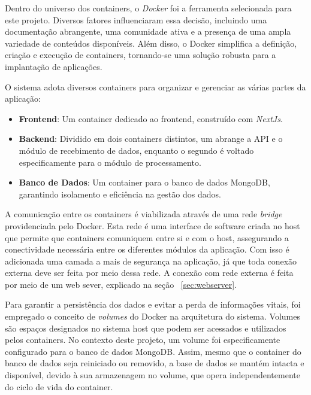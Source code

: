 Dentro do universo dos containers, o \textit{Docker} foi a ferramenta selecionada para este projeto. Diversos fatores influenciaram essa decisão, incluindo uma documentação abrangente, uma comunidade ativa e a presença de uma ampla variedade de conteúdos disponíveis. Além disso, o Docker simplifica a definição, criação e execução de containers, tornando-se uma solução robusta para a implantação de aplicações.

O sistema adota diversos containers para organizar e gerenciar as várias partes da aplicação:
\begin{itemize}
    \item \textbf{Frontend}: Um container dedicado ao frontend, construído com \textit{NextJs}.
    \item \textbf{Backend}: Dividido em dois containers distintos, um abrange a API e o módulo de recebimento de dados, enquanto o segundo é voltado especificamente para o módulo de processamento.
    \item \textbf{Banco de Dados}: Um container para o banco de dados MongoDB, garantindo isolamento e eficiência na gestão dos dados.
\end{itemize}

A comunicação entre os containers é viabilizada através de uma rede \textit{bridge} providenciada pelo Docker. Esta rede é uma interface de software criada no host que permite que containers comuniquem entre si e com o host, assegurando a conectividade necessária entre os diferentes módulos da aplicação. Com isso é adicionada uma camada a mais de segurança na aplicação, já que toda conexão externa deve ser feita por meio dessa rede. A conexão com rede externa é feita por meio de um web sever, explicado na seção ~\ref{sec:webserver}.

Para garantir a persistência dos dados e evitar a perda de informações vitais, foi empregado o conceito de \textit{volumes} do Docker na arquitetura do sistema. Volumes são espaços designados no sistema host que podem ser acessados e utilizados pelos containers. No contexto deste projeto, um volume foi especificamente configurado para o banco de dados MongoDB. Assim, mesmo que o container do banco de dados seja reiniciado ou removido, a base de dados se mantém intacta e disponível, devido à sua armazenagem no volume, que opera independentemente do ciclo de vida do container.

